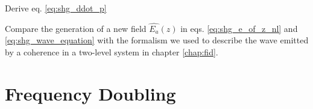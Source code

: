 \begin{questions}

\item Derive eq. \ref{eq:shg_ddot_p}

\item Compare the generation of a new field $\hat{E_a}(z)$ in eqs. \ref{eq:shg_e_of_z_nl} and   \ref{eq:shg_wave_equation} with the formalism we used to describe the wave emitted by a coherence in a two-level system in chapter \ref{chap:fid}.


\end{questions}


\section{Frequency Doubling}

